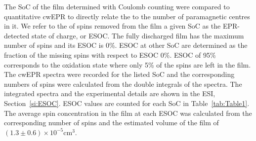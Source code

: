 The SoC of the film determined with Coulomb counting were compared to quantitative cwEPR to directly relate the \rs{,} to the number of paramagnetic centres in it. We refer to the  of spins removed from the  film  a given SoC as the EPR-detected state of charge, or ESOC. The fully discharged film has the maximum number of spins and its ESOC is 0\%. ESOC at other SoC are determined as the fraction of the missing spins with respect to ESOC 0\%. ESOC of 95\%  corresponds to the oxidation state where only 5\% of the  spins are left in the film. The cwEPR spectra were recorded for the listed SoC\rs{,} and the corresponding numbers of spins were calculated from the double integrals of the spectra. The integrated spectra and the experimental details are shown in the ESI, Section~\ref{si:ESOC}.  ESOC values are counted for each SoC in Table~\ref{tab:Table1}. The average spin concentration in the film  at each ESOC was calculated from the corresponding number of spins and the estimated volume of the film of $\left(1.3\pm0.6\right)\times10^{-5}$cm$^{3}$.


